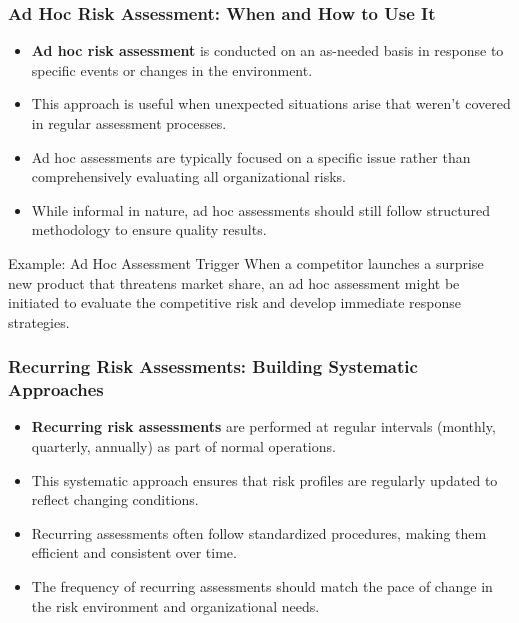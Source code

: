 \documentclass{beamer}
\begin{document}
    \begin{frame}
    \frametitle{Ad Hoc Risk Assessment: When and How to Use It}
    \begin{itemize}
      \item \textbf{Ad hoc risk assessment} is conducted on an as-needed basis in response to specific events or changes in the environment.
      \item This approach is useful when unexpected situations arise that weren't covered in regular assessment processes.
      \item Ad hoc assessments are typically focused on a specific issue rather than comprehensively evaluating all organizational risks.
      \item While informal in nature, ad hoc assessments should still follow structured methodology to ensure quality results.
    \end{itemize}
    
    \begin{exampleblock}{Example: Ad Hoc Assessment Trigger}
    When a competitor launches a surprise new product that threatens market share, an ad hoc assessment might be initiated to evaluate the competitive risk and develop immediate response strategies.
    \end{exampleblock}
    \end{frame}
    
\begin{frame}
\frametitle{Recurring Risk Assessments: Building Systematic Approaches}
\begin{itemize}
  \item \textbf{Recurring risk assessments} are performed at regular intervals (monthly, quarterly, annually) as part of normal operations.
  \item This systematic approach ensures that risk profiles are regularly updated to reflect changing conditions.
  \item Recurring assessments often follow standardized procedures, making them efficient and consistent over time.
  \item The frequency of recurring assessments should match the pace of change in the risk environment and organizational needs.
\end{itemize}
\begin{center}
\end{center}
\end{frame}
\end{document}
